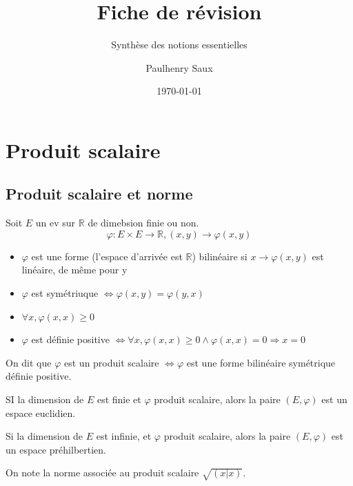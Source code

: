 \documentclass[french]{yLectureNote}
\title{Fiche de révision}
\subtitle{Synthèse des notions essentielles}
\author{Paulhenry Saux}
\date{\today}
\newcommand{\R}[0]{\mathbb{R}}
\begin{document}
\chapter{Produit scalaire}
\section{Produit scalaire et norme}

\begin{definition}
    Soit $E$ un ev sur $\R$ de dimebsion finie ou non.
    $$\varphi : E\times E \to \R, (x,y)\to \varphi(x,y)$$
    \begin{itemize}
        \item $\varphi$ est une forme (l'espace d'arrivée est $\R$) bilinéaire si $x\to \varphi(x,y)$ est linéaire, de m\^eme pour y
        \item $\varphi$ est symétriuque $\iff \varphi(x,y) = \varphi(y,x)$
        \item $\forall x, \varphi(x,x) \geq0$
        \item $\varphi$ est définie positive $\iff \forall x, \varphi(x,x)\geq 0 \wedge \varphi(x,x) = 0 \Rightarrow x=0$
    \end{itemize}
    On dit que $\varphi$ est un produit scalaire $\iff \varphi$ est une forme bilinéaire symétrique définie positive.
\end{definition}
\begin{definition}
    SI la dimension de $E$ est finie et $\varphi$ produit scalaire, alors la paire $(E,\varphi)$ est un espace euclidien.


\end{definition}

\begin{definition}
        Si la dimension de $E$ est infinie, et $\varphi$ produit scalaire, alors la paire $(E,\varphi)$ est un espace préhilbertien.

\end{definition}
\begin{definition}
[Norme]
    On note la norme associée au produit scalaire $\sqrt{(x|x)}$.

\end{definition}
\end{document}
